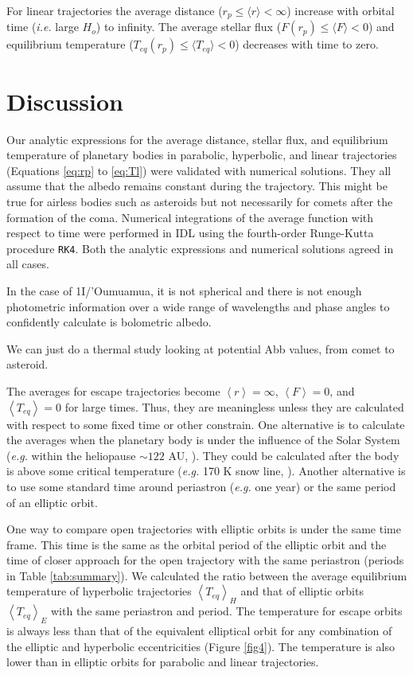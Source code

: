 \documentclass[a4paper,fleqn,usenatbib]{mnras}
\begin{document}
For linear trajectories the average distance ($r_p \leq \langle r \rangle < \infty$) increase with orbital time (\emph{i.e.} large $H_o$) to infinity. The average stellar flux ($F(r_p) \leq \langle F \rangle < 0$) and equilibrium temperature ($T_{eq}(r_p) \leq \langle T_{eq} \rangle < 0$) decreases with time to zero.


\section{Discussion}
\label{sec:discussion}

Our analytic expressions for the average distance, stellar flux, and equilibrium temperature of planetary bodies in parabolic, hyperbolic, and linear trajectories (Equations \ref{eq:rp} to \ref{eq:Tl}) were validated with numerical solutions. They all assume that the albedo remains constant during the trajectory. This might be true for airless bodies such as asteroids but not necessarily for comets after the formation of the coma. Numerical integrations of the average function with respect to time were performed in IDL using the fourth-order Runge-Kutta procedure \texttt{RK4}. Both the analytic expressions and numerical solutions agreed in all cases.

In the case of 1I/'Oumuamua, it is not spherical and there is not enough photometric information over a wide range of wavelengths and phase angles to confidently calculate is bolometric albedo.

We can just do a thermal study looking at potential Abb values, from comet to asteroid.

The averages for escape trajectories become $\left<r\right>=\infty$, $\left<F\right>=0$, and $\left<T_{eq}\right>=0$ for large times. Thus, they are meaningless unless they are calculated with respect to some fixed time or other constrain. One alternative is to calculate the averages when the planetary body is under the influence of the Solar System (\emph{e.g.} within the heliopause $\sim122$ AU, \citet{2017ApJ...834..197C}). They could be calculated after the body is above some critical temperature (\emph{e.g.} 170 K snow line, \citet{2008ApJ...673..502K}). Another alternative is to use some standard time around periastron (\emph{e.g.} one year) or the same period of an elliptic orbit.

One way to compare open trajectories with elliptic orbits is under the same time frame. This time is the same as the orbital period of the elliptic orbit and the time of closer approach for the open trajectory with the same periastron (periods in Table \ref{tab:summary}). We calculated the ratio between the average equilibrium temperature of hyperbolic trajectories $\left<T_{eq}\right>_H$ and that of elliptic orbits $\left<T_{eq}\right>_E$ with the same periastron and period. The temperature for escape orbits is always less than that of the equivalent elliptical orbit for any combination of the elliptic and hyperbolic eccentricities (Figure \ref{fig4}). The temperature is also lower than in elliptic orbits for parabolic and linear trajectories.
\end{document}
